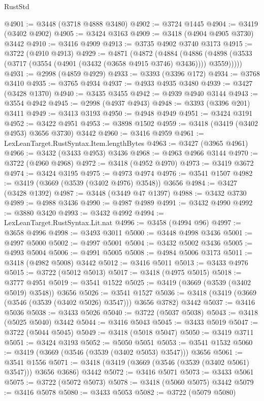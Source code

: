 \begin{lexlean}{RustStd}
\begin{coremodule}
@4901 := @3448 (@3718 @4888 @3480)
@4902 := @3724 @1445
@4904 := @3419 (@3402 @4902)
@4905 := @3424 @3163
@4909 := @3418 (@4904 @4905 @3730) @3442
@4910 := @3416 @4909
@4913 := @3735 @4902 @3740 @3173
@4915 := @3722 (@4910 @4913)
@4929 := @4871
    (@4872
      (@4884
        (@4886 (@4898 (@3533 (@3717 (@3554 (@4901 (@3432 (@3658 @4915 @3746) @3436)))) @3559)))))
@4931 := @2998 (@4859 @4929)
@4933 := @3393 (@3396 @172)
@4934 := @3768 @3410
@4935 := @3765 @4934
@4937 := @4933 @4935 @3480
@4939 := @3427 (@3428 @1370)
@4940 := @3435 @3455
@4942 := @4939 @4940 @3144
@4943 := @3554 @4942
@4945 := @2998 (@4937 @4943)
@4948 := @3393 (@3396 @201) @3411
@4949 := @3413 @3193
@4950 := @4948 @4949
@4951 := @3424 @3191
@4952 := @3422 @4951
@4953 := @3898 @1502
@4959 := @3418 (@3419 (@3402 @4953) @3656 @3730) @3442
@4960 := @3416 @4959
@4961 := LexLeanTarget.RustSyntax.Item.lengthBytes
@4963 := @3427 (@3965 @4961)
@4966 := @3432 (@3433 @4953) @3436
@4968 := @4963 @4966 @3144
@4970 := @3722 (@4960 @4968)
@4972 := @3418 (@4952 @4970)
@4973 := @3419 @3672
@4974 := @3424 @3195
@4975 := @4973 @4974
@4976 := @3541 @1507
@4982 := @3419 (@3669 (@3539 (@3402 @4976) @3548)) @3656
@4984 := @3427 (@3428 @1392)
@4987 := @3448 (@3449 @47 @1397)
@4988 := @3432 @3730
@4989 := @4988 @3436
@4990 := @4987 @4989
@4991 := @3432 @4990
@4992 := @3880 @3420
@4993 := @3432 @4992
@4994 := LexLeanTarget.RustSyntax.Lit.nat
@4996 := @3458 (@4994 @96)
@4997 := @3658 @4996
@4998 := @3493 @3011
@5000 := @3448 @4998 @3436
@5001 := @4997 @5000
@5002 := @4997 @5001
@5004 := @3432 @5002 @3436
@5005 := @4993 @5004
@5006 := @4991 @5005
@5008 := @4984 @5006 @3173
@5011 := @3418 (@4982 @5008) @3442
@5012 := @3416 @5011
@5013 := @3433 @4976
@5015 := @3722 (@5012 @5013)
@5017 := @3418 (@4975 @5015)
@5018 := @3777 @4951
@5019 := @3541 @1522
@5025 := @3419 (@3669 (@3539 (@3402 @5019) @3548)) @3656
@5026 := @3541 @1527
@5036 := @3418 (@3419 (@3669 (@3546 (@3539 (@3402 @5026) @3547))) @3656 @3782) @3442
@5037 := @3416 @5036
@5038 := @3433 @5026
@5040 := @3722 (@5037 @5038)
@5043 := @3418 (@5025 @5040) @3442
@5044 := @3416 @5043
@5045 := @3433 @5019
@5047 := @3722 (@5044 @5045)
@5049 := @3418 (@5018 @5047)
@5050 := @3419 @3711
@5051 := @3424 @3193
@5052 := @5050 @5051
@5053 := @3541 @1532
@5060 := @3419 (@3669 (@3546 (@3539 (@3402 @5053) @3547))) @3656
@5061 := @3541 @1556
@5071 := @3418 (@3419 (@3669 (@3546 (@3539 (@3402 @5061) @3547))) @3656 @3686) @3442
@5072 := @3416 @5071
@5073 := @3433 @5061
@5075 := @3722 (@5072 @5073)
@5078 := @3418 (@5060 @5075) @3442
@5079 := @3416 @5078
@5080 := @3433 @5053
@5082 := @3722 (@5079 @5080)

\end{coremodule}
\end{lexlean}
